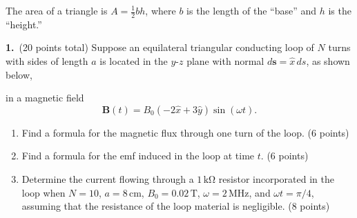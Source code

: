 \documentclass[12pt,letterpaper]{article}
\begin{document}
\vspace{10pt}

The area of a triangle is $A = \frac{1}{2}bh$, where $b$ is the length of the ``base'' and $h$ is the ``height.''

\begin{center}
\end{center}

\newpage

\textbf{1.}\ (20 points total) Suppose an equilateral triangular conducting loop of $N$ turns
with sides of length $a$ is located in the $y$-$z$ plane with normal $d\mathbf{s} = \hat{x}\,ds$,
as shown below,

\begin{center}
\end{center}

in a magnetic field
\[
  \mathbf{B}(t) = B_0(-2\hat{x} + 3\hat{y})\sin(\omega t).
\]

\begin{enumerate}[label=(\alph*), leftmargin=2.5cm]

  \item Find a formula for the magnetic flux through one turn of the loop.
        \hfill(6 points)
  \vspace{5.5cm}

  \item Find a formula for the emf induced in the loop at time $t$.
        \hfill(6 points)
  \vspace{5.5cm}

  \item Determine the current flowing through a $1\,\mathrm{k\Omega}$ resistor incorporated
        in the loop when $N = 10$, $a = 8\,\mathrm{cm}$, $B_0 = 0.02\,\mathrm{T}$,
        $\omega = 2\,\mathrm{MHz}$, and $\omega t = \pi/4$, assuming that the resistance
        of the loop material is negligible.
        \hfill(8 points)
  \vspace{6cm}

\end{enumerate}
\end{document}
